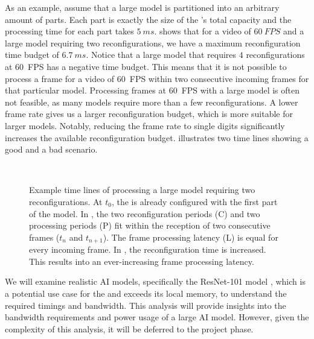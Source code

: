 As an example, assume that a large model is partitioned into an arbitrary amount of parts.
Each part is exactly the size of the \graicore{}'s total capacity and the processing time for each part takes $\SI{5}{ms}$.
 shows that for a video of $\SI{60}{FPS}$ and a large model requiring two reconfigurations, we have a maximum reconfiguration time budget of $\SI{6.7}{ms}$.
Notice that a large model that requires $4$ reconfigurations at \SI{60}{FPS} has a negative time budget.
This means that it is not possible to process a frame for a video of \SI{60}{FPS} within two consecutive incoming frames for that particular model.
Processing frames at \SI{60}{FPS} with a large model is often not feasible, as many models require more than a few reconfigurations.
A lower frame rate gives us a larger reconfiguration budget, which is more suitable for larger models.
Notably, reducing the frame rate to single digits significantly increases the available reconfiguration budget.
 illustrates two time lines showing a good and a bad scenario.

\begin{figure}[htbp]
    \centering
    \subfloat[]{
        
        \label{fig:large_reconfig_ex1}
    } \\
    \subfloat[]{
        
        \label{fig:large_reconfig_ex2}
    }
    \caption{
        Example time lines of processing a large model requiring two reconfigurations.
        At $t_0$, the \graicore{} is already configured with the first part of the model.
        In \protect{}, the two reconfiguration periods (C) and two processing periods (P) fit within the reception of two consecutive frames ($t_n$ and $t_{n+1}$).
        The frame processing latency (L) is equal for every incoming frame.
        In \protect{}, the reconfiguration time is increased. 
        This results into an ever-increasing frame processing latency.
    }
    \label{fig:larger_reconfig_ex}
\end{figure}

We will examine realistic AI models, specifically the ResNet-101 model \cite{heDeepResidualLearning2015}, which is a potential use case for the \graicore{} and exceeds its local memory, to understand the required timings and bandwidth.
This analysis will provide insights into the bandwidth requirements and power usage of a large AI model.
However, given the complexity of this analysis, it will be deferred to the project phase.

